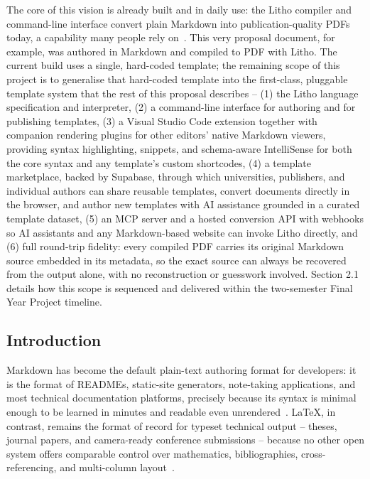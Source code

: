 \documentclass[a4paper,twoside]{article}
\begin{document}
The core of this vision is already built and in daily use: the Litho compiler and command-line interface convert plain Markdown into publication-quality PDFs today, a capability many people rely on~\cite{ref7}. This very proposal document, for example, was authored in Markdown and compiled to PDF with Litho. The current build uses a single, hard-coded template; the remaining scope of this project is to generalise that hard-coded template into the first-class, pluggable template system that the rest of this proposal describes -- (1) the Litho language specification and interpreter, (2) a command-line interface for authoring and for publishing templates, (3) a Visual Studio Code extension together with companion rendering plugins for other editors' native Markdown viewers, providing syntax highlighting, snippets, and schema-aware IntelliSense for both the core syntax and any template's custom shortcodes, (4) a template marketplace, backed by Supabase, through which universities, publishers, and individual authors can share reusable templates, convert documents directly in the browser, and author new templates with AI assistance grounded in a curated template dataset, (5) an MCP server and a hosted conversion API with webhooks so AI assistants and any Markdown-based website can invoke Litho directly, and (6) full round-trip fidelity: every compiled PDF carries its original Markdown source embedded in its metadata, so the exact source can always be recovered from the output alone, with no reconstruction or guesswork involved. Section 2.1 details how this scope is sequenced and delivered within the two-semester Final Year Project timeline.

\subsection{Introduction}

Markdown has become the default plain-text authoring format for developers: it is the format of READMEs, static-site generators, note-taking applications, and most technical documentation platforms, precisely because its syntax is minimal enough to be learned in minutes and readable even unrendered~\cite{ref1}. LaTeX, in contrast, remains the format of record for typeset technical output -- theses, journal papers, and camera-ready conference submissions -- because no other open system offers comparable control over mathematics, bibliographies, cross-referencing, and multi-column layout~\cite{ref2}.
\end{document}
